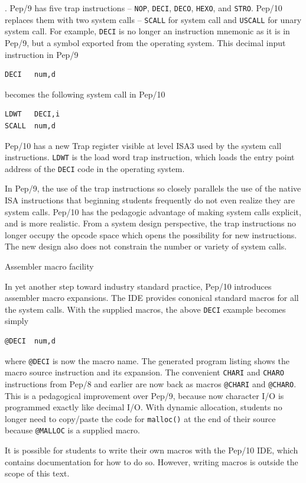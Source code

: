 \documentclass[10pt,fleqn]{book}
\newenvironment{exercises}
   {\begin{list}
      {\arabic{ecounter}.}
      {
         \usecounter{ecounter}
         \setcounter {ecounter}{0}
         \setlength\leftmargin{2pc}
         \setlength\labelwidth{6pc}
         \setlength\labelsep{1pc}
      }}
   {\end{list}}
\newcounter{ecounter}
\begin{document}
\begin{exercises}
Pep/9 has five trap instructions -- \verb|NOP|, \verb|DECI|, \verb|DECO|, \verb|HEXO|, and \verb|STRO|.
Pep/10 replaces them with two system calls -- \verb|SCALL| for system call and \verb|USCALL| for unary system call.
For example, \verb|DECI| is no longer an instruction mnemonic as it is in Pep/9, but a symbol exported from the operating system.
This decimal input instruction in Pep/9
\begin{verbatim}
DECI   num,d
\end{verbatim}
becomes the following system call in Pep/10
\begin{verbatim}
LDWT   DECI,i
SCALL  num,d
\end{verbatim}
Pep/10 has a new Trap register visible at level ISA3 used by the system call instructions.
\verb|LDWT| is the load word trap instruction, which loads the entry point address of the \verb|DECI| code in the operating system.

In Pep/9, the use of the trap instructions so closely parallels the use of the native ISA instructions that beginning students frequently do not even realize they are system calls.
Pep/10 has the pedagogic advantage of making system calls explicit, and is more realistic.
From a system design perspective, the trap instructions no longer occupy the opcode space which opens the possibility for new instructions.
The new design also does not constrain the number or variety of system calls.

\item Assembler macro facility

In yet another step toward industry standard practice, Pep/10 introduces assembler macro expansions.
The IDE provides cononical standard macros for all the system calls.
With the supplied macros, the above \verb|DECI| example becomes simply
\begin{verbatim}
@DECI  num,d
\end{verbatim}
where \verb|@DECI| is now the macro name.
The generated program listing shows the macro source instruction and its expansion.
The convenient \verb|CHARI| and \verb|CHARO| instructions from Pep/8 and earlier are now back as macros \verb|@CHARI| and \verb|@CHARO|.
This is a pedagogical improvement over Pep/9, because now character I/O is programmed exactly like decimal I/O.
With dynamic allocation, students no longer need to copy/paste the code for \verb|malloc()| at the end of their source because \verb|@MALLOC| is a supplied macro.

It is possible for students to write their own macros with the Pep/10 IDE, which contains documentation for how to do so.
However, writing macros is outside the scope of this text.


\end{exercises}
\end{document}
